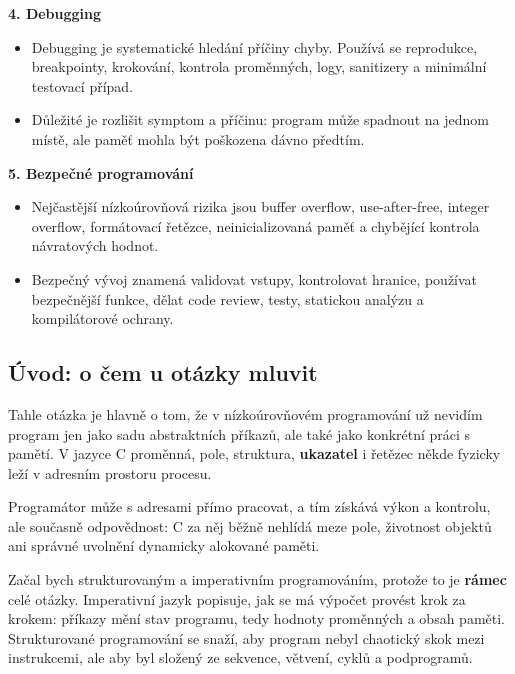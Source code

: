 \textbf{4. Debugging}
\begin{itemize}
  \item Debugging je systematické hledání příčiny chyby. Používá se reprodukce, breakpointy, krokování, kontrola proměnných, logy, sanitizery a minimální testovací případ.
  \item Důležité je rozlišit symptom a příčinu: program může spadnout na jednom místě, ale paměť mohla být poškozena dávno předtím.
\end{itemize}

\textbf{5. Bezpečné programování}
\begin{itemize}
  \item Nejčastější nízkoúrovňová rizika jsou buffer overflow, use-after-free, integer overflow, formátovací řetězce, neinicializovaná paměť a chybějící kontrola návratových hodnot.
  \item Bezpečný vývoj znamená validovat vstupy, kontrolovat hranice, používat bezpečnější funkce, dělat code review, testy, statickou analýzu a kompilátorové ochrany.
\end{itemize}


\subsection*{Úvod: o čem u otázky mluvit}

Tahle otázka je hlavně o tom, že v nízkoúrovňovém programování už nevidím program jen jako sadu abstraktních příkazů, ale také jako konkrétní práci s pamětí. V jazyce C proměnná, pole, struktura, \textbf{ukazatel} i řetězec někde fyzicky leží v adresním prostoru procesu.

Programátor může s adresami přímo pracovat, a tím získává výkon a kontrolu, ale současně odpovědnost: C za něj běžně nehlídá meze pole, životnost objektů ani správné uvolnění dynamicky alokované paměti.

Začal bych strukturovaným a imperativním programováním, protože to je \textbf{rámec} celé otázky. Imperativní jazyk popisuje, jak se má výpočet provést krok za krokem: příkazy mění stav programu, tedy hodnoty proměnných a obsah paměti. Strukturované programování se snaží, aby program nebyl chaotický skok mezi instrukcemi, ale aby byl složený ze sekvence, větvení, cyklů a podprogramů.

